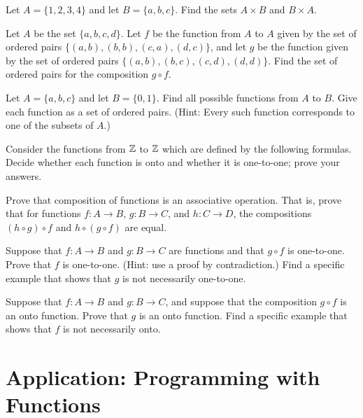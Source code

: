 \begin{exercises}

\problem Let $A=\{1,2,3,4\}$ and let $B=\{a,b,c\}$.
Find the sets $A\times B$ and $B\times A$.

\problem Let $A$ be the set $\{a,b,c,d\}$.  Let $f$ be the
function from $A$ to $A$ given by the set of ordered pairs
$\{(a,b),(b,b),(c,a),(d,c)\}$, and let $g$ be the function
given by the set of ordered pairs $\{(a,b),(b,c),(c,d),(d,d)\}$.
Find the set of ordered pairs for the composition $g\circ f$.

\problem Let $A=\{a,b,c\}$ and let $B=\{0,1\}$.  Find all
possible functions from $A$ to $B$.  Give each function as
a set of ordered pairs.  (Hint: Every such function corresponds
to one of the subsets of $A$.)

\problem Consider the functions from ${\mathbb Z}$ to ${\mathbb Z}$ which are
defined by the following formulas.  Decide whether each
function is onto and whether it is one-to-one; prove your answers.  

\problem Prove that composition of functions is an associative
operation.  That is, prove that for functions
$f\colon A\to B$, $g\colon B\to C$, and $h\colon C\to D$,
the compositions $(h\circ g)\circ f$ and $h\circ(g\circ f)$
are equal.

\problem 
Suppose that $f\colon A\to B$ and $g\colon B\to C$ are
functions and that $g\circ f$ is one-to-one.  
\ppart Prove that $f$ is one-to-one. (Hint: use a proof by contradiction.)
\ppart Find
a specific example that shows that $g$ is not necessarily
one-to-one.

\problem Suppose that $f\colon A\to B$ and $g\colon B\to C$,
and suppose that the composition $g\circ f$ is an onto
function.  
\ppart Prove that $g$ is an onto function.  
\ppart Find
a specific example that shows that $f$ is not necessarily
onto.



\end{exercises}



\section{Application: Programming with Functions}\label{S-sets-5}

